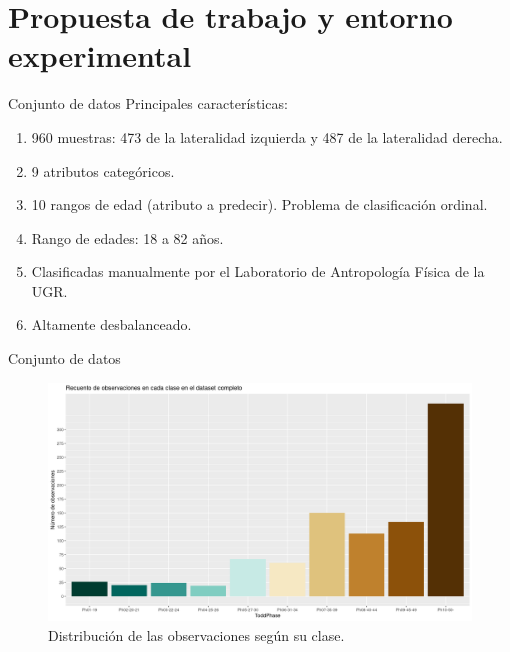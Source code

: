 \documentclass{beamer}
\begin{document}
\section{Propuesta de trabajo y entorno experimental}
\begin{frame}{Conjunto de datos}
	Principales características:

	\begin{enumerate}
		\item 960 muestras: 473 de la lateralidad izquierda y 487 de la lateralidad derecha.
		\item 9 atributos categóricos.
		\item 10 rangos de edad (atributo a predecir). Problema de clasificación ordinal.
		\item Rango de edades: 18 a 82 años.
		\item Clasificadas manualmente por el Laboratorio de Antropología Física de la UGR.
		\item Altamente desbalanceado.
	\end{enumerate}
\end{frame}


\begin{frame}{Conjunto de datos}

	\begin{figure}[H]
		\centering
		\includegraphics[width=\textwidth]{distribucion_clases_completo.png}
		\caption{Distribución de las observaciones según su clase.}
		\label{fig:distribucion_clases_completo}
	\end{figure}

\end{frame}
\end{document}
